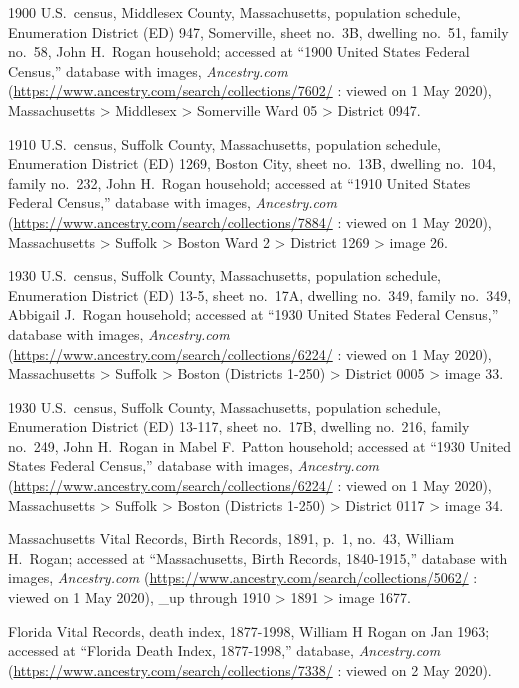 \begin{thebibliography}{999}
	1900 U.S.\ census, Middlesex County, Massachusetts, population schedule, Enumeration District (ED) 947, Somerville, sheet no.\ 3B, dwelling no.\ 51, family no.\ 58, John H.\ Rogan household; accessed at ``1900 United States Federal Census,'' database with images, \textit{Ancestry.com} (\url{https://www.ancestry.com/search/collections/7602/} : viewed on 1 May 2020), Massachusetts > Middlesex > Somerville Ward 05 > District 0947.
	
	1910 U.S.\ census, Suffolk County, Massachusetts, population schedule, Enumeration District (ED) 1269, Boston City, sheet no.\ 13B, dwelling no.\ 104, family no.\ 232, John H.\ Rogan household; accessed at ``1910 United States Federal Census,'' database with images, \textit{Ancestry.com} (\url{https://www.ancestry.com/search/collections/7884/} : viewed on 1 May 2020), Massachusetts > Suffolk > Boston Ward 2 > District 1269 > image 26.
	
	1930 U.S.\ census, Suffolk County, Massachusetts, population schedule, Enumeration District (ED) 13-5, sheet no.\ 17A, dwelling no.\ 349, family no.\ 349, Abbigail J.\ Rogan household; accessed at ``1930 United States Federal Census,'' database with images, \textit{Ancestry.com} (\url{https://www.ancestry.com/search/collections/6224/} : viewed on 1 May 2020), Massachusetts > Suffolk > Boston (Districts 1-250) > District 0005 > image 33.
	
	1930 U.S.\ census, Suffolk County, Massachusetts, population schedule, Enumeration District (ED) 13-117, sheet no.\ 17B, dwelling no.\ 216, family no.\ 249, John H.\ Rogan in Mabel F.\ Patton household; accessed at ``1930 United States Federal Census,'' database with images, \textit{Ancestry.com} (\url{https://www.ancestry.com/search/collections/6224/} : viewed on 1 May 2020), Massachusetts > Suffolk > Boston (Districts 1-250) > District 0117 > image 34.
	
	Massachusetts Vital Records, Birth Records, 1891, p.\ 1, no.\ 43, William H.\ Rogan; accessed at ``Massachusetts, Birth Records, 1840-1915,'' database with images, \textit{Ancestry.com} (\url{https://www.ancestry.com/search/collections/5062/} : viewed on 1 May 2020), \_up through 1910 > 1891 > image 1677.
	
	Florida Vital Records, death index, 1877-1998, William H Rogan on Jan 1963; accessed at ``Florida Death Index, 1877-1998,'' database, \textit{Ancestry.com} (\url{https://www.ancestry.com/search/collections/7338/} : viewed on 2 May 2020).
	

\end{thebibliography}
